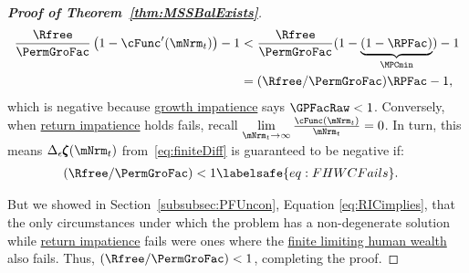 \documentclass[\econtexRoot/BufferStockTheory]{subfiles}
\begin{document}
\begin{proof}[\textbf{Proof of Theorem~\ref{thm:MSSBalExists}}]
%
\begin{align*}
   \frac{\Rfree}{\PermGroFac}\left(1-\cFunc^{\prime}({\mNrm}_t)\right) - 1 & <   \frac{\Rfree}{\PermGroFac}(1-\underbrace{(1-\RPFac)}_{\MPCmin}) - 1  \\
                                                      & = (\Rfree/\PermGroFac)\RPFac - 1, 
\end{align*}
%
which is negative because \hyperlink{GIC}{growth impatience} says $\GPFacRaw < 1$. Conversely, when \hyperlink{RIC}{return impatience} holds fails, recall $\lim\limits_{\mNrm_{t} \rightarrow \infty} \frac{\cFunc(\mNrm_{t})}{\mNrm_{t}} = 0$. In turn, this means $\Delta_{\epsilon}\difFunc(\mNrm_{t})$ from~\eqref{eq:finiteDiff} is guaranteed to be negative if:
%
\begin{align}
  (\Rfree/\PermGroFac) & < 1  \labelsafe{eq:FHWCFails}.
\end{align}

But we showed in Section~\ref{subsubsec:PFUncon}, Equation \eqref{eq:RICimplies}, that the only circumstances under which the problem has a non-degenerate solution while \hyperlink{RIC}{return impatience} fails were ones where the \hyperlink{FHWC}{finite limiting human wealth} also fails. Thus, $(\Rfree/\PermGroFac) < 1$, completing the proof. 

\end{proof}
\end{document}
